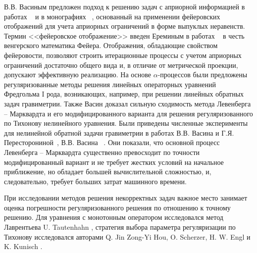 {В.В. Васиным предложен подход к решению задач с априорной информацией в работах ~\cite{Vas1982, Vas1988} и в монографиях ~\cite{VasAge1993, VasEre2005}, основанный на применении фейеровских отображений для учета априорных ограничений в форме выпуклых неравенств. Термин <<фейеровское отображение>> введен Ереминым в работах ~\cite{Ere1965, Ere1966, Ere1968} в честь венгерского математика Фейера. Отображения, обладающие свойством фейеровости, позволяют строить итерационные процессы с учетом априорных ограничений достаточно общего вида и, в отличие от метрической проекции, допускают эффективную реализацию. На основе $\alpha$-процессов были предложены регуляризованные методы решения линейных операторных уравнений Фредгольма I рода, возникающих, например, при решении линейных обратных задач гравиметрии. Также Васин доказал сильную сходимость метода Левенберга -- Марквардта и его модифицированного варианта для решения регуляризованного по Тихонову нелинейного уравнения. Были приведены численные эксперименты для нелинейной обратной задачи гравиметрии в работах В.В. Васина и Г.Я. Пересторониной~\cite{VasPer2011}, В.В. Васина ~\cite{Vas2012}. Они показали, что основной процесс Левенберга -- Марквардта существенно превосходит по точности модифицированный вариант и не требует жестких условий на начальное приближение, но обладает большей вычислительной сложностью, и, следовательно, требует больших затрат машинного времени.

При исследовании методов решения некорректных задач важное место занимает оценка погрешности регуляризованного решения по отношению к точному решению. Для уравнения с монотонным оператором исследовался метод Лаврентьева U. Tautenhahn \cite{Tau2002,Tau2004}, стратегия выбора параметра регуляризации по Тихонову исследовался авторами Q. Jin Zong-Yi Hou, O. Scherzer, H. W. Engl и K. Kunisch \cite{JinZon1993,JinZon1997,SchEngKun1993}.
}

